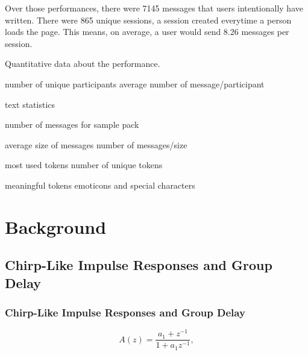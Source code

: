 \documentclass{aes2e}
\begin{document}


Over those performances, there were 7145 messages that users intentionally have written. There were 865 unique sessions, a session created everytime a person loads the page. This means, on average, a user would send 8.26 messages per session.

\begin{table}
\begin{tabnote}
Quantitative data about the performance.
\end{tabnote}
\end{table}

number of unique participants
average number of message/participant

text statistics

number of messages for sample pack

average size of messages
number of messages/size

most used tokens
number of unique tokens

meaningful tokens
emoticons and special characters  


\section{Background}


\subsection{Chirp-Like Impulse Responses and Group Delay}


\subsubsection{Chirp-Like Impulse Responses and Group Delay}

\begin{equation}
A(z) = \frac{{a_1  + z^{ - 1} }}{{1 + a_1 z^{ - 1} }},
\end{equation}
\end{document}
